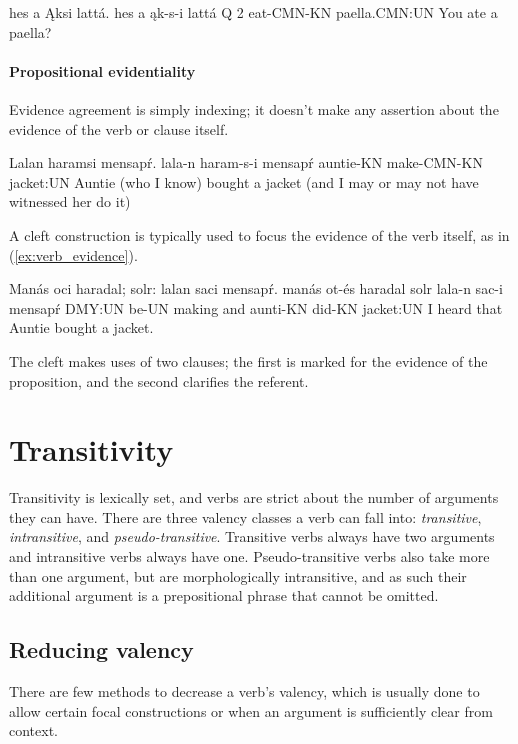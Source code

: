 \begin{example} \label{ex:mixed_agreement}
	\script hes a Ąksi lattá.
	\bits hes a ąk-s-i lattá
	\gloss Q 2 eat-CMN-KN paella.CMN:UN
	\tr You ate a paella?
\end{example}

\paragraph{Propositional evidentiality} Evidence agreement is simply indexing; it doesn't make any assertion about the evidence of the verb or clause itself. 

\begin{example}
	\script Lalan haramsi mensapŕ.
	\bits lala-n haram-s-i mensapŕ
	\gloss auntie-KN make-CMN-KN jacket:UN
	\tr Auntie (who I know) bought a jacket (and I may or may not have witnessed her do it) 
\end{example}

A cleft construction is typically used to focus the evidence of the verb itself, as in (\ref{ex:verb_evidence}).

\begin{example}
	\label{ex:verb_evidence}
	\script Manás oci haradal; solr: lalan saci mensapŕ.
	\bits manás ot-és haradal solr lala-n sac-i mensapŕ
	\gloss DMY:UN be-UN making and aunti-KN did-KN jacket:UN
	\tr I heard that Auntie bought a jacket.
\end{example}

The cleft makes uses of two clauses; the first is marked for the evidence of the proposition, and the second clarifies the referent.

\section{Transitivity}
Transitivity is lexically set, and verbs are strict about the number of arguments they can have. There are three valency classes a verb can fall into: \emph{transitive}, \emph{intransitive}, and \emph{pseudo-transitive}. Transitive verbs always have two arguments and intransitive verbs always have one. Pseudo-transitive verbs also take more than one argument, but are morphologically intransitive, and as such their additional argument is a prepositional phrase that cannot be omitted. 

\subsection{Reducing valency}
There are few methods to decrease a verb's valency, which is usually done to allow certain focal constructions or when an argument is sufficiently clear from context.


